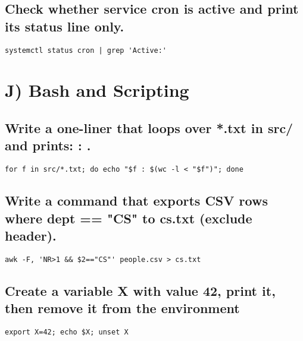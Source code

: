 \subsection{Check whether service cron is active and print its status line only.}
\begin{verbatim}
systemctl status cron | grep 'Active:'
\end{verbatim}

\section{ J) Bash and Scripting}
\subsection{Write a one-liner that loops over *.txt in src/ and prints: : .}
\begin{verbatim}
for f in src/*.txt; do echo "$f : $(wc -l < "$f")"; done
\end{verbatim}

\subsection{Write a command that exports CSV rows where dept == "CS" to cs.txt (exclude header).}
\begin{verbatim}
awk -F, 'NR>1 && $2=="CS"' people.csv > cs.txt
\end{verbatim}

\subsection{Create a variable X with value 42, print it, then remove it from the environment}
\begin{verbatim}
export X=42; echo $X; unset X
\end{verbatim}